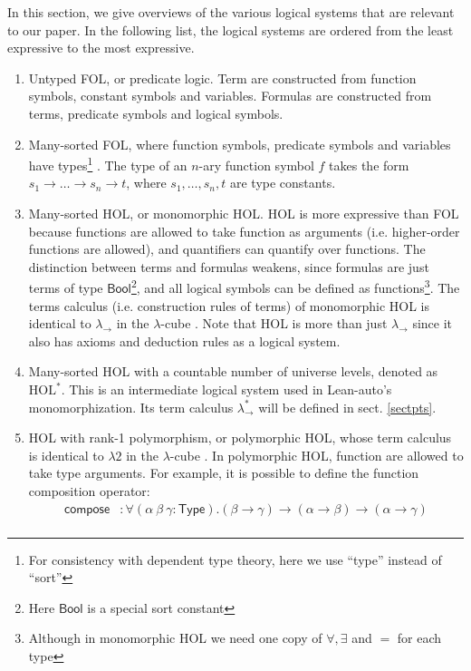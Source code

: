   In this section, we give overviews of the various logical systems
  that are relevant to our paper. In the following list, the logical systems
  are ordered from the least expressive to the most expressive. 
  \begin{enumerate}
    \item Untyped FOL, or predicate logic. Term are constructed from
      function symbols, constant symbols and variables.
      Formulas are constructed from terms, predicate symbols and logical symbols.
    \item Many-sorted FOL, where function symbols, predicate symbols and variables have
      types\footnote{For consistency with dependent type theory, here we use ``type'' instead of ``sort''}
      . The type of an $n$-ary function symbol $f$ takes the form
      $s_1 \to \dots \to s_n \to t$, where $s_1, \dots, s_n, t$ are type constants.
    \item Many-sorted HOL, or monomorphic HOL. HOL is more expressive than
      FOL because functions are allowed to take function as arguments
      (i.e. higher-order functions are allowed), and quantifiers can quantify over functions.
      The distinction between terms and formulas weakens, since
      formulas are just terms of type $\mathsf{Bool}$\footnote{Here $\mathsf{Bool}$ is a special sort constant}, 
      and all logical symbols can be defined as
      functions\footnote{Although in monomorphic HOL we need one copy of $\forall, \exists$ and $=$ for each type}.
      The terms calculus (i.e. construction rules of terms) of monomorphic HOL
      is identical to $\lambda_\to$ in the $\lambda$-cube \cite{LambdaWithType}.
      Note that HOL is more than just $\lambda_\to$ since it also has axioms and
      deduction rules as a logical system.
    \item Many-sorted HOL with a countable number of universe levels, denoted as $\text{HOL}^*$. This is an
      intermediate logical system used in Lean-auto's monomorphization. Its term calculus $\lambda_\to^*$
      will be defined in sect. \ref{sectpts}.
    \item HOL with rank-1 polymorphism, or polymorphic HOL, whose term calculus is identical
      to $\lambda 2$ in the $\lambda$-cube \cite{LambdaWithType}. In polymorphic HOL, function are
      allowed to take type arguments. For example, it is possible to define the function
      composition operator:
      $$\begin{aligned}
      \mathsf{compose} & : \forall (\alpha \ \beta \ \gamma : \mathsf{Type}). (\beta \to \gamma) \to (\alpha \to \beta) \to (\alpha \to \gamma) \\

\end{aligned}$$
\end{enumerate}
